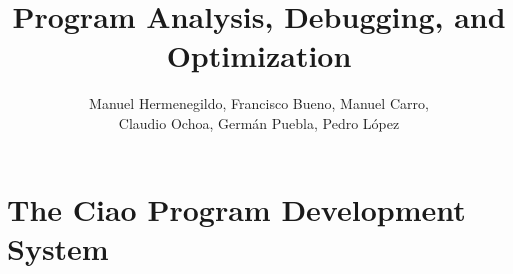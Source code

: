 \documentclass{article}
\renewcommand{\_}{\char'137}
\begin{document}
\title{Program Analysis, Debugging, and Optimization\\
\huge{}
}

\author{
Manuel Hermenegildo, 
Francisco Bueno, 
Manuel Carro, \\
Claudio Ochoa,
Germ\'{a}n Puebla, 
Pedro L\'{o}pez
}

\maketitle

\section{The Ciao Program Development System}
\end{document}
